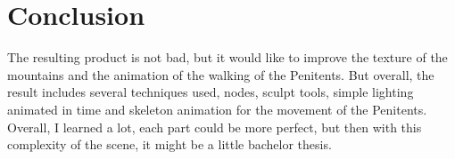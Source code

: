 \documentclass[12pt,a4paper,titlepage,final,tikz,border=4mm]{report}
\begin{document}
\section{Conclusion}
The resulting product is not bad, but it would like to improve the texture of the mountains and the animation of the walking of the Penitents. But overall, the result includes several techniques used, nodes, sculpt tools, simple lighting animated in time and skeleton animation for the movement of the Penitents. Overall, I learned a lot, each part could be more perfect, but then with this complexity of the scene, it might be a little bachelor thesis.
\newpage
\end{document}
